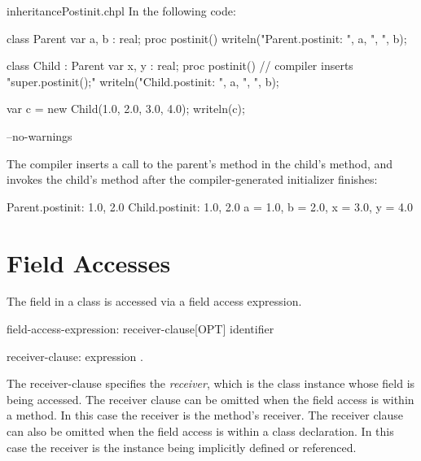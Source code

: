 \begin{chapelexample}{inheritancePostinit.chpl}
In the following code:
\begin{chapel}
class Parent {
  var a, b : real;
  proc postinit() {
    writeln("Parent.postinit: ", a, ", ", b);
  }
}

class Child : Parent {
  var x, y : real;
  proc postinit() {
    // compiler inserts "super.postinit();"
    writeln("Child.postinit: ", a, ", ", b);
  }
}

var c = new Child(1.0, 2.0, 3.0, 4.0);
writeln(c);
\end{chapel}
\begin{chapelcompopts}
--no-warnings
\end{chapelcompopts}
The compiler inserts a call to the parent's  method in the
child's  method, and invokes the child's  method
after the compiler-generated initializer finishes:
\begin{chapelprintoutput}{}
Parent.postinit: 1.0, 2.0
Child.postinit: 1.0, 2.0
{a = 1.0, b = 2.0, x = 3.0, y = 4.0}
\end{chapelprintoutput}
\end{chapelexample}

\section{Field Accesses}
\label{Class_Field_Accesses}

The field in a class is accessed via a field access expression.

\begin{syntax}
field-access-expression:
  receiver-clause[OPT] identifier

receiver-clause:
  expression .
\end{syntax}

The receiver-clause specifies the \emph{receiver}, which is the class
instance whose field is being accessed.
The receiver clause can be omitted when the field access is within a method.
In this case the receiver is the method's receiver.
The receiver clause can also be omitted when the field access is within
a class declaration. In this case the receiver is the instance
being implicitly defined or referenced.

